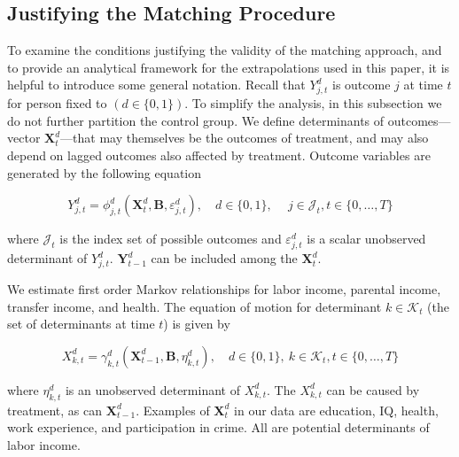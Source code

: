 \begin{figure}
\end{figure}

\subsection{Justifying the Matching Procedure} \label{section:just}

To examine the conditions justifying the validity of the matching approach, and to provide an analytical framework for the extrapolations used in this paper, it is helpful to introduce some general notation. Recall that $Y^d_{j,t}$ is outcome $j$ at time $t$ for person fixed to $(d\in\{0,1\})$. To simplify the analysis, in this subsection we do not further partition the control group. We define determinants of outcomes---vector $\bm{X}^d_t$---that may themselves be the outcomes of treatment, and may also depend on lagged outcomes also affected by treatment. Outcome variables are generated by the following equation

\begin{equation}\label{eq:trenchfoot}
Y^d_{j,t} = \phi^d_{j,t} (\bm{X}^d_t, \bm{B}, \varepsilon^d_{j,t}), \quad d \in \{0,1\}, \quad \  j \in \mathcal{J}_t, t \in \{0,\dots,T\}
\end{equation}

\noindent where $\mathcal{J}_t$ is the index set of possible outcomes and $\varepsilon^d_{j,t}$ is a scalar unobserved determinant of $Y^d_{j,t}$. $\bm{Y}^d_{t-1}$ can be included among the $\bm{X}^d_{t}$.

We estimate first order Markov relationships for labor income, parental income, transfer income, and health. The equation of motion for determinant $k \in \mathcal{K}_t$ (the set of determinants at time $t$) is given by

\begin{equation}\label{eq:frostbite}
X^d_{k,t} = \gamma^d_{k,t} (\bm{X}^d_{t-1}, \bm{B}, \eta^d_{k,t}), \quad d \in \{0,1\}, \ k \in \mathcal{K}_t, t \in \{0,\dots,T\}
\end{equation}

\noindent where $\eta^d_{k,t}$ is an unobserved determinant of $X^d_{k,t}$. The $X^d_{k,t}$ can be caused by treatment, as can $\bm{X}^d_{t-1}$. Examples of $\bm{X}^d_t$ in our data are education, IQ, health, work experience, and participation in crime. All are potential determinants of labor income.

